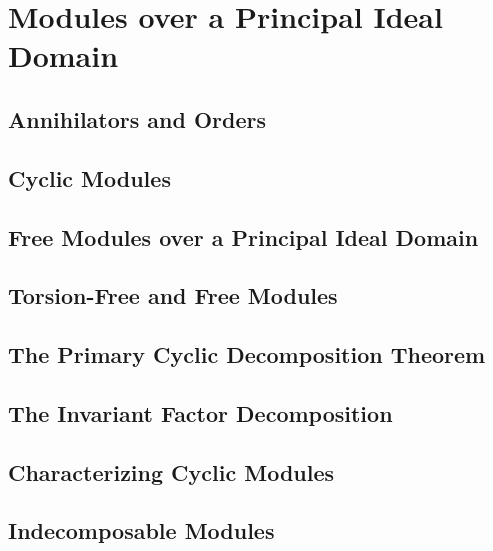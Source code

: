 \chapter{Modules over a Principal Ideal Domain}
\section{Annihilators and Orders}
\section{Cyclic Modules}
\section{Free Modules over a Principal Ideal Domain}
\section{Torsion-Free and Free Modules}
\section{The Primary Cyclic Decomposition Theorem}
\section{The Invariant Factor Decomposition}
\section{Characterizing Cyclic Modules}
\section{Indecomposable Modules}
